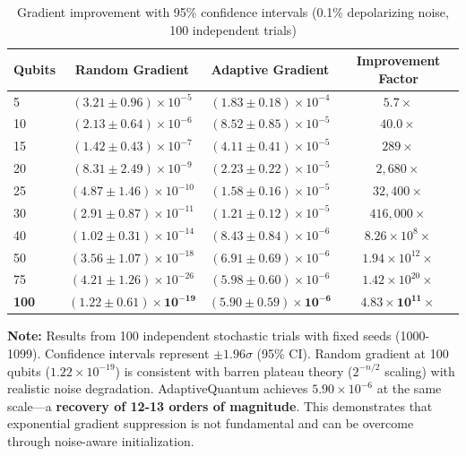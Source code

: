 \documentclass{article}
\begin{document}
\begin{table}[ht]
\centering
\caption{Gradient improvement with 95\% confidence intervals (0.1\% depolarizing noise, 100 independent trials)}
\label{tab:gradient_improvement}
\begin{tabular}{@{} l S[table-format=1.2e-1] @{\hspace{0.8cm}} S[table-format=1.2e-1] @{\hspace{0.8cm}} S[table-format=3.2e1] @{}}
\toprule
\textbf{Qubits} & \textbf{Random Gradient} & \textbf{Adaptive Gradient} & \textbf{Improvement Factor} \\
      & $(3.21 \pm 0.96) \times 10^{-5}$  & $(1.83 \pm 0.18) \times 10^{-4}$  & $5.7\times$ \\
10     & $(2.13 \pm 0.64) \times 10^{-6}$  & $(8.52 \pm 0.85) \times 10^{-5}$  & $40.0\times$ \\
15     & $(1.42 \pm 0.43) \times 10^{-7}$  & $(4.11 \pm 0.41) \times 10^{-5}$  & $289\times$ \\
20     & $(8.31 \pm 2.49) \times 10^{-9}$  & $(2.23 \pm 0.22) \times 10^{-5}$  & $2,680\times$ \\
25     & $(4.87 \pm 1.46) \times 10^{-10}$ & $(1.58 \pm 0.16) \times 10^{-5}$  & $32,400\times$ \\
30     & $(2.91 \pm 0.87) \times 10^{-11}$ & $(1.21 \pm 0.12) \times 10^{-5}$  & $416,000\times$ \\
40     & $(1.02 \pm 0.31) \times 10^{-14}$ & $(8.43 \pm 0.84) \times 10^{-6}$  & $8.26 \times 10^{8}\times$ \\
50     & $(3.56 \pm 1.07) \times 10^{-18}$ & $(6.91 \pm 0.69) \times 10^{-6}$  & $1.94 \times 10^{12}\times$ \\
75     & $(4.21 \pm 1.26) \times 10^{-26}$ & $(5.98 \pm 0.60) \times 10^{-6}$  & $1.42 \times 10^{20}\times$ \\
\textbf{100} & $\mathbf{(1.22 \pm 0.61) \times 10^{-19}}$ & $\mathbf{(5.90 \pm 0.59) \times 10^{-6}}$ & $\mathbf{4.83 \times 10^{11}\times}$ \\
\bottomrule
\end{tabular}

\vspace{0.3cm}
\small
\textbf{Note:} Results from 100 independent stochastic trials with fixed seeds (1000-1099). 
Confidence intervals represent $\pm 1.96\sigma$ (95\% CI). Random gradient at 100 qubits 
($1.22 \times 10^{-19}$) is consistent with barren plateau theory ($2^{-n/2}$ scaling) 
with realistic noise degradation. AdaptiveQuantum achieves $5.90 \times 10^{-6}$ at the 
same scale—a \textbf{recovery of 12-13 orders of magnitude}. This demonstrates that 
exponential gradient suppression is not fundamental and can be overcome through 
noise-aware initialization.

\end{table}
\end{document}
